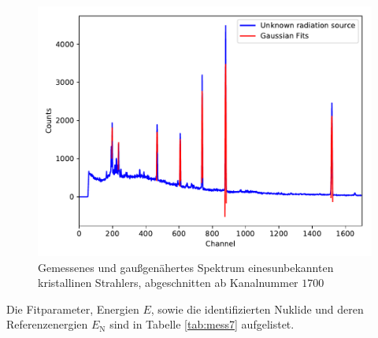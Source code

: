 \begin{figure}
  \centering
  \includegraphics[scale=0.7]{content/plot4.pdf}
  \caption{Gemessenes und gaußgenähertes Spektrum einesunbekannten kristallinen Strahlers,
           abgeschnitten ab Kanalnummer $\num{1700}$}
  \label{fig:plot4} 
\end{figure}

Die Fitparameter, Energien $E$, sowie die identifizierten Nuklide und deren Referenzenergien $E_\text{N}$ sind in Tabelle
\ref{tab:mess7} aufgelistet.


